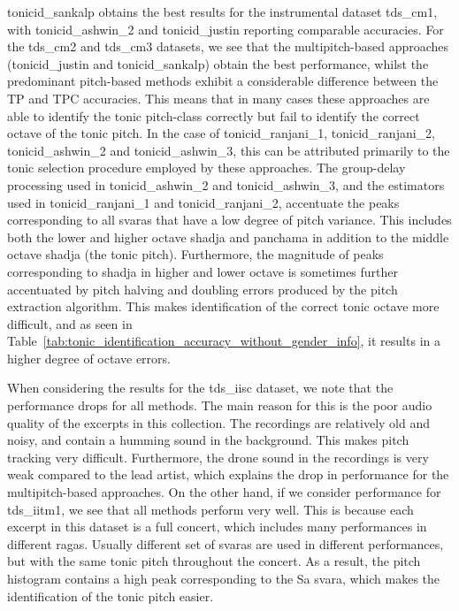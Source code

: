 {\acrshort{tonicid_sankalp} obtains the best results for the instrumental dataset \acrshort{tds_cm1}, with \acrshort{tonicid_ashwin_2} and \acrshort{tonicid_justin} reporting comparable accuracies. For the \acrshort{tds_cm2} and \acrshort{tds_cm3} datasets, we see that the multipitch-based approaches (\acrshort{tonicid_justin} and \acrshort{tonicid_sankalp}) obtain the best performance, whilst the predominant pitch-based methods exhibit a considerable difference between the TP and TPC accuracies. This means that in many cases these approaches are able to identify the tonic pitch-class correctly but fail to identify the correct octave of the tonic pitch. In the case of \acrshort{tonicid_ranjani_1}, \acrshort{tonicid_ranjani_2}, \acrshort{tonicid_ashwin_2} and \acrshort{tonicid_ashwin_3}, this can be attributed primarily to the tonic selection procedure employed by these approaches. The group-delay processing used in \acrshort{tonicid_ashwin_2} and \acrshort{tonicid_ashwin_3}, and the estimators used in \acrshort{tonicid_ranjani_1} and \acrshort{tonicid_ranjani_2}, accentuate the peaks corresponding to all \glspl{svara} that have a low degree of pitch variance. This includes both the lower and higher octave \gls{shadja} and \gls{panchama} in addition to the middle octave \gls{shadja} (the tonic pitch). Furthermore, the magnitude of peaks corresponding to \gls{shadja} in higher and lower octave is sometimes further accentuated by pitch halving and doubling errors produced by the pitch extraction algorithm. This makes identification of the correct tonic octave more difficult, and as seen in Table~\ref{tab:tonic_identification_accuracy_without_gender_info}, it results in a higher degree of octave errors.

When considering the results for the \acrshort{tds_iisc} dataset, we note that the performance drops for all methods. The main reason for this is the poor audio quality of the excerpts in this collection. The recordings are relatively old and noisy, and contain a humming sound in the background. This makes pitch
tracking very difficult. Furthermore, the drone sound in the recordings is very weak compared to the lead artist, which explains the drop in performance for the multipitch-based approaches. On the other hand, if we consider performance for \acrshort{tds_iitm1}, we see that all methods perform very well. This is because each excerpt in this dataset is a full concert, which includes many performances in different \glspl{raga}. Usually different set of \glspl{svara} are used in different performances, but with the same tonic pitch throughout the concert. As a result, the pitch histogram contains a high peak corresponding to the Sa \gls{svara}, which makes the identification of the tonic pitch easier.

}
